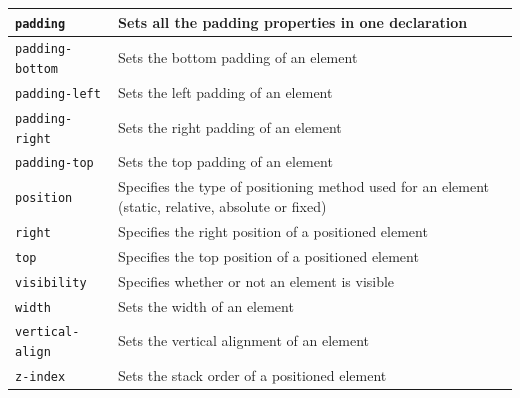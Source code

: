 \documentclass[11pt, letterpaper]{article}
\begin{document}
\begin{longtable}{p{5cm} p{10cm}}
				\texttt{padding} & Sets all the padding properties in one declaration \\\midrule
				\texttt{padding-bottom} & Sets the bottom padding of an element \\\midrule
				\texttt{padding-left} & Sets the left padding of an element \\\midrule
				\texttt{padding-right} & Sets the right padding of an element \\\midrule
				\texttt{padding-top} & Sets the top padding of an element \\\midrule
				\texttt{position} & Specifies the type of positioning method used for an element (static, relative, absolute or fixed) \\\midrule
				\texttt{right} & Specifies the right position of a positioned element \\\midrule
				\texttt{top} & Specifies the top position of a positioned element \\\midrule
				\texttt{visibility} & Specifies whether or not an element is visible \\\midrule
				\texttt{width} & Sets the width of an element \\\midrule
				\texttt{vertical-align} & Sets the vertical alignment of an element \\\midrule
				\texttt{z-index} & Sets the stack order of a positioned element \\\midrule
			\end{longtable}
		
\end{document}
